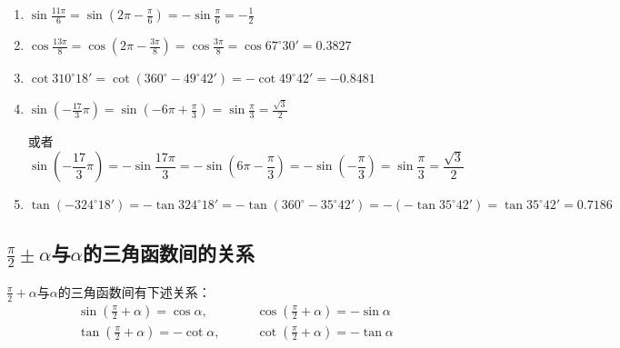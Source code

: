 \begin{solution}
\begin{enumerate}
    \item $\sin\frac{11\pi}{6}=\sin\left(2\pi-\frac{\pi}{6}\right)=-\sin\frac{\pi}{6}=-\frac{1}{2}$
    \item $\cos\frac{13\pi}{8}=\cos\left(2\pi-\frac{3\pi}{8}\right)=\cos\frac{3\pi}{8}=\cos67^{\circ}30'=0.3827$
    \item $\cot310^{\circ}18'=\cot(360^{\circ}-49^{\circ}42')=-\cot49^{\circ}42'=-0.8481$
    \item $\sin\left(-\frac{17}{3}\pi\right)=\sin\left(-6\pi+\frac{\pi}{3}\right)=\sin\frac{\pi}{3}=\frac{\sqrt{3}}{2}$
    
或者
\[\sin\left(-\frac{17}{3}\pi\right)=-\sin\frac{17\pi}{3}=-\sin\left(6\pi-\frac{\pi}{3}\right)=-\sin\left(-\frac{\pi}{3}\right)=\sin\frac{\pi}{3}=\frac{\sqrt{3}}{2}\]

    \item $\tan(-324^{\circ}18')=-\tan324^{\circ}18'=-\tan(360^{\circ}-35^{\circ}42')=-(-\tan 35^{\circ}42')=\tan 35^{\circ}42'=0.7186$
\end{enumerate}    
\end{solution}

\subsection{$\frac{\pi}{2}\pm\alpha$与$\alpha$的三角函数间的关系}

$\frac{\pi}{2}+\alpha$与$\alpha$的三角函数间有下述关系：
\begin{equation}
    \begin{split}
\sin\left(\frac{\pi}{2}+\alpha\right)=\cos\alpha,&\qquad \cos\left(\frac{\pi}{2}+\alpha\right)=-\sin\alpha\\
\tan\left(\frac{\pi}{2}+\alpha\right)=-\cot\alpha,&\qquad \cot\left(\frac{\pi}{2}+\alpha\right)=-\tan\alpha        
    \end{split}
\end{equation}

